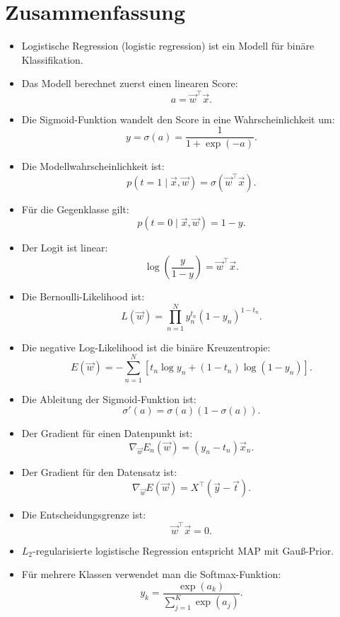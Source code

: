 \section{Zusammenfassung}

\begin{itemize}
    \item Logistische Regression (logistic regression) ist ein Modell für binäre Klassifikation.
    \item Das Modell berechnet zuerst einen linearen Score:
    \[
        a
        =
        \vec{w}^{\top}\vec{x}.
    \]
    \item Die Sigmoid-Funktion wandelt den Score in eine Wahrscheinlichkeit um:
    \[
        y
        =
        \sigma(a)
        =
        \frac{1}{1+\exp(-a)}.
    \]
    \item Die Modellwahrscheinlichkeit ist:
    \[
        p(t=1\mid\vec{x},\vec{w})
        =
        \sigma(\vec{w}^{\top}\vec{x}).
    \]
    \item Für die Gegenklasse gilt:
    \[
        p(t=0\mid\vec{x},\vec{w})
        =
        1-y.
    \]
    \item Der Logit ist linear:
    \[
        \log
        \left(
            \frac{y}{1-y}
        \right)
        =
        \vec{w}^{\top}\vec{x}.
    \]
    \item Die Bernoulli-Likelihood ist:
    \[
        L(\vec{w})
        =
        \prod_{n=1}^{N}
        y_n^{t_n}
        (1-y_n)^{1-t_n}.
    \]
    \item Die negative Log-Likelihood ist die binäre Kreuzentropie:
    \[
        E(\vec{w})
        =
        -\sum_{n=1}^{N}
        \left[
            t_n\log y_n
            +
            (1-t_n)\log(1-y_n)
        \right].
    \]
    \item Die Ableitung der Sigmoid-Funktion ist:
    \[
        \sigma'(a)
        =
        \sigma(a)(1-\sigma(a)).
    \]
    \item Der Gradient für einen Datenpunkt ist:
    \[
        \nabla_{\vec{w}}E_n(\vec{w})
        =
        (y_n-t_n)\vec{x}_n.
    \]
    \item Der Gradient für den Datensatz ist:
    \[
        \nabla_{\vec{w}}E(\vec{w})
        =
        X^{\top}(\vec{y}-\vec{t}).
    \]
    \item Die Entscheidungsgrenze ist:
    \[
        \vec{w}^{\top}\vec{x}=0.
    \]
    \item \(L_2\)-regularisierte logistische Regression entspricht MAP mit Gauß-Prior.
    \item Für mehrere Klassen verwendet man die Softmax-Funktion:
    \[
        y_k
        =
        \frac{\exp(a_k)}
        {\sum_{j=1}^{K}\exp(a_j)}.
    \]
\end{itemize}

